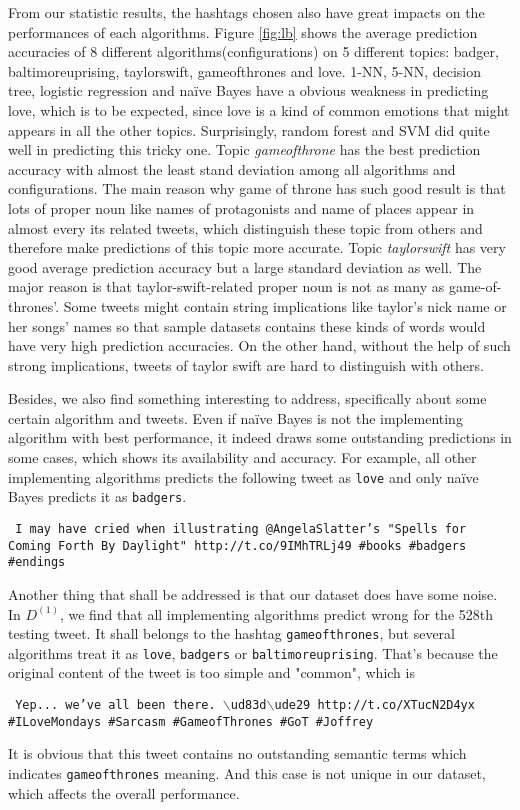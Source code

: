 \documentclass[letterpaper,11pt,twocolumn]{article}
\begin{document}
From our statistic results, the hashtags chosen also have great impacts on the performances of each algorithms. Figure \ref{fig:lb} shows the average prediction accuracies of 8 different algorithms(configurations) on 5 different topics: badger, baltimoreuprising, taylorswift, gameofthrones and love. 1-NN, 5-NN, decision tree, logistic regression and na{\"i}ve Bayes have a obvious weakness in predicting love, which is to be expected, since love is a kind of common emotions that might appears in all the other topics. Surprisingly, random forest and SVM did quite well in predicting this tricky one. Topic \emph{gameofthrone} has the best prediction accuracy with almost the least stand deviation among all algorithms and configurations. The main reason why game of throne has such good result is that lots of proper noun like names of protagonists and name of places appear in almost every its related tweets, which distinguish these topic from others and therefore make predictions of this topic more accurate. Topic \emph{taylorswift} has very good average prediction accuracy but a large standard deviation as well. The major reason is that taylor-swift-related proper noun is not as many as game-of-thrones'. Some tweets might contain string implications like taylor's nick name or her songs' names so that sample datasets contains these kinds of words would have very high prediction accuracies. On the other hand, without the help of such strong implications, tweets of taylor swift are hard to distinguish with others.

Besides, we also find something interesting to address, specifically about some certain algorithm and tweets. Even if na{\"i}ve Bayes is not the implementing algorithm with best performance, it indeed draws some outstanding predictions in some cases, which shows its availability and accuracy. For example, all other implementing algorithms predicts the following tweet as \texttt{love} and only na{\"i}ve Bayes predicts it as \texttt{badgers}.
\begin{framed}
\texttt{
I may have cried when illustrating @AngelaSlatter's "Spells for Coming Forth By Daylight" http://t.co/9IMhTRLj49 \#books \#badgers \#endings
}
\end{framed}
Another thing that shall be addressed is that our dataset does have some noise. In $D^{(1)}$, we find that all implementing algorithms predict wrong for the 528th testing tweet. It shall belongs to the hashtag \texttt{gameofthrones}, but several algorithms treat it as \texttt{love}, \texttt{badgers} or \texttt{baltimoreuprising}. That's because the original content of the tweet is too simple and "common", which is
\begin{framed}
\texttt{
Yep... we've all been there. $\backslash$ud83d$\backslash$ude29 http://t.co/XTucN2D4yx  \#ILoveMondays \#Sarcasm \#GameofThrones \#GoT \#Joffrey
}
\end{framed}
It is obvious that this tweet contains no outstanding semantic terms which indicates \texttt{gameofthrones} meaning. And this case is not unique in our dataset, which affects the overall performance.
\end{document}

